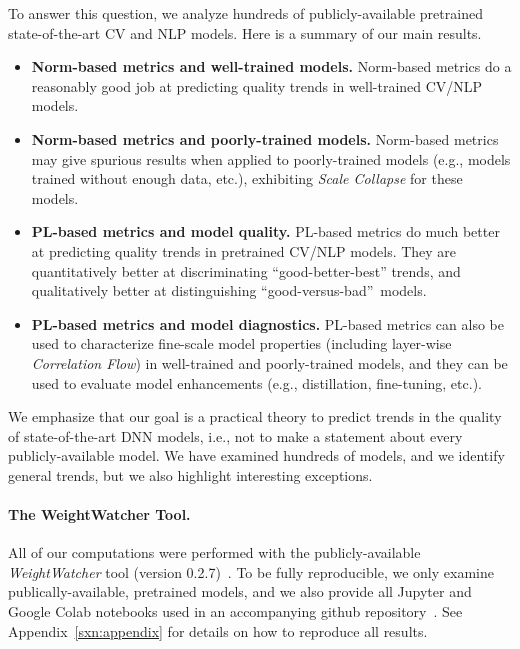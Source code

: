 To answer this question, we analyze hundreds of publicly-available pretrained state-of-the-art CV and NLP models. 
Here is a summary of our main results.
\begin{itemize}
\item
\textbf{Norm-based metrics and well-trained models.}
Norm-based metrics do a reasonably good job at predicting quality trends in well-trained CV/NLP models.
\item
\textbf{Norm-based metrics and poorly-trained models.}
Norm-based metrics may give spurious results when applied to poorly-trained models (e.g., models trained without enough data, etc.), exhibiting \emph{Scale Collapse} for these models. 
\item 
\textbf{PL-based metrics and model quality.}
PL-based metrics do much better at predicting quality trends in pretrained CV/NLP models.  
They are quantitatively better at discriminating ``good-better-best'' trends, and qualitatively better at distinguishing ``good-versus-bad''~models.
\item 
\textbf{PL-based metrics and model diagnostics.}
PL-based metrics can also be used to characterize fine-scale model properties (including layer-wise \emph{Correlation Flow}) in well-trained and poorly-trained models, and they can be used to evaluate model enhancements (e.g., distillation, fine-tuning, etc.).
\end{itemize}

\noindent
We emphasize that our goal is a practical theory to predict trends in the quality of state-of-the-art DNN models, i.e., not to make a statement about every publicly-available model.
We have examined hundreds of models, and we identify general trends, but we also highlight interesting exceptions.


\paragraph{The WeightWatcher Tool.}

All of our computations were performed with the publicly-available \emph{WeightWatcher} tool (version 0.2.7)~\cite{weightwatcher_package}.
To be fully reproducible, we only examine publically-available, pretrained models, and we also provide all Jupyter and Google Colab notebooks used in an accompanying github repository~\cite{kdd20_sub_repo}.
See Appendix~\ref{sxn:appendix} for details on how to reproduce all results.


